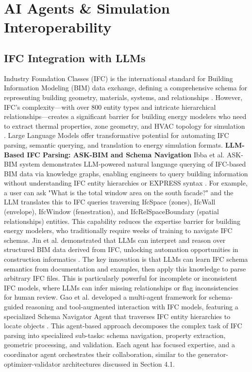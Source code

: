 \documentclass[12pt,a4paper]{article}
\begin{document}
\section{AI Agents \& Simulation Interoperability}
\subsection{IFC Integration with LLMs}
Industry Foundation Classes (IFC) is the international standard for Building Information Modeling (BIM) data exchange, defining a comprehensive schema for representing building geometry, materials, systems, and relationships \cite{ref20}. However, IFC's complexity---with over 800 entity types and intricate hierarchical relationships---creates a significant barrier for building energy modelers who need to extract thermal properties, zone geometry, and HVAC topology for simulation \cite{ref29}. Large Language Models offer transformative potential for automating IFC parsing, semantic querying, and translation to energy simulation formats.
\textbf{LLM-Based IFC Parsing: ASK-BIM and Schema Navigation}
Ibba et al. ASK-BIM system demonstrates LLM-powered natural language querying of IFC-based BIM data via knowledge graphs, enabling engineers to query building information without understanding IFC entity hierarchies or EXPRESS syntax \cite{ref20}. For example, a user can ask "What is the total window area on the south facade?" and the LLM translates this to IFC queries traversing IfcSpace (zones), IfcWall (envelope), IfcWindow (fenestration), and IfcRelSpaceBoundary (spatial relationships) entities. This capability reduces the expertise barrier for building energy modelers, who traditionally require weeks of training to navigate IFC schemas.
Jin et al. demonstrated that LLMs can interpret and reason over structured BIM data derived from IFC, unlocking automation opportunities in construction informatics \cite{ref29}. The key innovation is that LLMs can learn IFC schema semantics from documentation and examples, then apply this knowledge to parse arbitrary IFC files. This is particularly powerful for incomplete or inconsistent IFC models, where LLMs can infer missing relationships or flag inconsistencies for human review.
Gao et al. developed a multi-agent framework for schema-guided reasoning and tool-augmented interaction with IFC models, featuring a specialized Schema Navigator Agent that traverses IFC entity hierarchies to locate objects \cite{ref16}. This agent-based approach decomposes the complex task of IFC parsing into specialized sub-tasks: schema navigation, property extraction, geometric processing, and validation. Each agent has focused expertise, and a coordinator agent orchestrates their collaboration, similar to the generator-optimizer-validator architectures discussed in Section 4.1.
\end{document}
